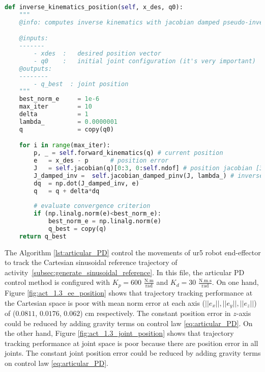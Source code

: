 \begin{lstlisting}[language=Python,caption={Function to compute inverse kinematics with jacobian damped psedo-inverse method.}, label={lst:inverse_kinematics}]
def inverse_kinematics_position(self, x_des, q0):
    """
    @info: computes inverse kinematics with jacobian damped pseudo-inverse.

    @inputs:
    -------
        - xdes  :   desired position vector
        - q0    :   initial joint configuration (it's very important)
    @outputs:
    --------        
        - q_best  : joint position
    """         
    best_norm_e     = 1e-6 
    max_iter        = 10
    delta           = 1
    lambda_         = 0.0000001
    q               = copy(q0)

    for i in range(max_iter):
        p, _ = self.forward_kinematics(q) # current position
        e   = x_des - p      # position error
        J   = self.jacobian(q)[0:3, 0:self.ndof] # position jacobian [3x6]
        J_damped_inv =  self.jacobian_damped_pinv(J, lambda_) # inverse jacobian [6x3]
        dq  = np.dot(J_damped_inv, e)
        q   = q + delta*dq
                   
        # evaluate convergence criterion
        if (np.linalg.norm(e)<best_norm_e):
            best_norm_e = np.linalg.norm(e)
            q_best = copy(q) 
    return q_best 
\end{lstlisting}

The Algorithm \ref{lst:articular_PD} control the movements of ur5 robot end-effector to track the Cartesian sinusoidal reference trajectory of activity~\ref{subsec:generate_sinusoidal_reference}. In this file, the articular PD control method is configured with ${K_{p}}=600$ $\mathrm{\frac{N.m}{rad}}$ and $K_{d}= 30$ $\mathrm{\frac{N.m.s}{rad}}$. On one hand, Figure \ref{fig:act_1.3_ee_position} shows that trajectory tracking performance at the Cartesian space is poor with mean norm error at each axis ($||e_x||, ||e_y||, ||e_z||$) of ($0.0811$, $0.0176$, $0.062$) cm respectively. The constant position error in $z$-axis could be reduced by adding gravity terms on control law \eqref{eq:articular_PD}. On the other hand, Figure \ref{fig:act_1.3_joint_position} shows that trajectory tracking performance at joint space is poor because there are position error in all joints. The constant joint position error could be reduced by adding gravity terms on control law \eqref{eq:articular_PD}.


